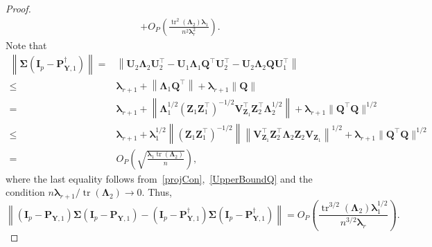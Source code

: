 \documentclass[12pt]{article} %
\DeclareMathOperator{\mytr}{tr}
\newcommand{\bQ}{\mathbf{Q}}
\newcommand{\bZ}{\mathbf{Z}}
\newcommand{\bP}{\mathbf{P}}
\newcommand{\bY}{\mathbf{Y}}
\newcommand{\bI}{\mathbf{I}}
\newcommand{\bU}{\mathbf{U}}
\newcommand{\bV}{\mathbf{V}}
\newcommand{\bfsym}[1]{\ensuremath{\boldsymbol{#1}}}
\def\blambda {\bfsym {\lambda}}
\def\bLambda {\bfsym {\Lambda}}
\def\bSigma {\bfsym {\Sigma}}
\theoremstyle{definition}
\begin{document}
\begin{appendices}
\begin{proof}
\begin{equation*}
\begin{split}
         +
         O_P\left(\frac{\mytr^2(\bLambda_2)\blambda_1}{n^2\blambda_r^2}\right)
         .
         \end{split}
         \end{equation*}
Note that
\begin{equation*}
    \begin{split}
         \left\|\bSigma 
         (\bI_p-\bP_{\bY,1}^{\dagger})\right\|
         =&
         \left\|
         \bU_2 \bLambda_2 \bU_2^\top
         -\bU_1 \bLambda_1 \bQ^\top \bU_2^\top
         -\bU_2 \bLambda_2 \bQ \bU_1^\top
         \right\|
         \\
         \leq &
         \blambda_{r+1}
         +
         \left\|
          \bLambda_1 \bQ^\top
          \right\|
          +
          \blambda_{r+1}
          \left\|
          \bQ 
         \right\|
         \\
         = &
         \blambda_{r+1}
         +
         \left\|
         \bLambda_1^{1/2} (\bZ_1 \bZ_1^\top)^{-1/2} \bV_{\bZ_1}^\top \bZ_2^\top \bLambda_2^{1/2}
         \right\|
         +
         \blambda_{r+1}\|\bQ^\top \bQ\|^{1/2}
         \\
         \leq &
         \blambda_{r+1}
         +
         \blambda_1^{1/2}
         \left\|
        (\bZ_1 \bZ_1^\top)^{-1/2}
         \right\|
         \left\|
         \bV_{\bZ_1}^\top \bZ_2^\top \bLambda_2 \bZ_2 \bV_{\bZ_1}
         \right\|^{1/2}
         +
         \blambda_{r+1}\|\bQ^\top \bQ\|^{1/2}
         \\
         =&
         O_P\left(\sqrt{\frac{\blambda_1\mytr(\bLambda_2)}{n}}\right),
    \end{split}
\end{equation*}
where the last equality follows from~\eqref{projCon},~\eqref{UpperBoundQ} and the condition $n\blambda_{r+1}/\mytr(\bLambda_2)\to 0$.
Thus,
\begin{equation}\label{choc1}
         \left\|
         (\bI_p-\bP_{\bY,1})
         \bSigma 
         (\bI_p-\bP_{\bY,1})
         -
         (\bI_p-\bP_{\bY,1}^{\dagger})
         \bSigma 
         (\bI_p-\bP_{\bY,1}^{\dagger})
         \right\|
         = 
         O_P\left(\frac{\mytr^{3/2}(\bLambda_2)\blambda_1^{1/2}}{n^{3/2}\blambda_r}\right)
         .
         \end{equation}


\end{proof}
\end{appendices}
\end{document}
